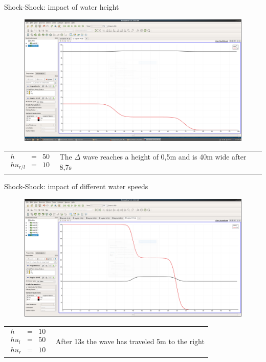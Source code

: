 \documentclass[shortpres]{beamer}
\newcommand{\imgvoffset}{-20pt}
\newcommand{\imgfullscale}{0.75}
\begin{document}
\begin{frame}{Shock-Shock: impact of water height}
	\begin{figure}[t]
		\vspace{\imgvoffset}
		\includegraphics[width=\imgfullscale\linewidth]{img/Shock_h50_t8-7.png}
	\end{figure}
	
	\begin{tabular}{m{3cm} m{\linewidth-5cm}}
		$
		\begin{matrix}
		h & = & 50\\
		hu_{r/l} & = & 10
		\end{matrix}
		$
		&
		
		The $\Delta$ wave reaches a height of 0,5m and is 40m wide after 8,7s
	\end{tabular}
\end{frame}



\begin{frame}{Shock-Shock: impact of different water speeds}
	\begin{figure}[t]
		\vspace{\imgvoffset}
		\includegraphics[width=\imgfullscale\linewidth]{img/Shock_hul50_t13.png}
		\caption*{}
	\end{figure}
	
	\begin{tabular}{m{3cm} m{\linewidth-5cm}}
		$
		\begin{matrix}
		h & = & 10\\
		hu_l & = & 50\\
		hu_r & = & 10
		\end{matrix}
		$
		&
		
		After 13s the wave has traveled 5m to the right 
	\end{tabular}
\end{frame}
\end{document}
